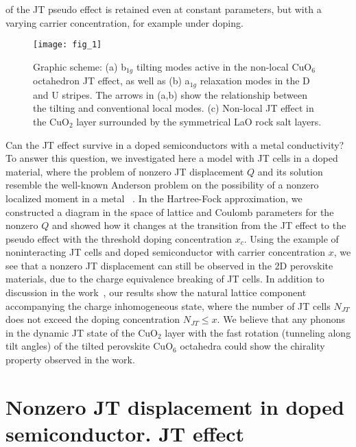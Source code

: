 \documentclass[%
 reprint,
groupedaddress,
 amsmath,amssymb,
 aps,
prb,
]{revtex4-1}
\begin{document}
of the JT pseudo effect is retained even at constant parameters, but with a varying carrier concentration, for example under doping.\\

\begin{figure*}
\texttt{[image: fig\_1]}
\caption{Graphic scheme: (a) b$_{1g}$ tilting modes active in the non-local CuO$_6$ octahedron JT effect, as well as (b) a$_{1g}$ relaxation modes in the D and U stripes. The arrows in (a,b) show the relationship between the tilting and conventional local modes. (c) Non-local JT effect in the CuO$_2$ layer surrounded by the symmetrical LaO rock salt layers.}
\label{fig:1}
\end{figure*}

Can the JT effect survive in a doped semiconductors with a metal conductivity? To answer this question, we investigated here a model with JT cells in a doped material, where the problem of nonzero JT displacement $Q$ and its solution resemble the well-known Anderson problem on the possibility of a nonzero localized moment in a metal ~\cite{Anderson1961}. In the Hartree-Fock approximation, we constructed a diagram in the space of lattice and Coulomb parameters for the nonzero $Q$ and showed how it changes at the transition from the JT effect to the pseudo effect with the threshold   doping concentration $x_c$. Using the example of noninteracting JT cells and doped semiconductor with carrier concentration $x$, we see that a nonzero JT displacement can still be observed in the 2D perovskite  materials, due to the charge equivalence breaking of JT cells. In addition to discussion in the work~\cite{Robinson2019}, our results show the natural lattice component accompanying the charge inhomogeneous state, where the number of JT cells $N_{JT}$  does not exceed the doping concentration $N_{JT}\leq x$.  We believe that any phonons in the dynamic JT state of the CuO$_2$ layer with the fast rotation (tunneling along tilt angles) of the tilted perovskite CuO$_6$ octahedra could show the chirality property observed in the work.~\cite{Grissonnanche2020}


\section{\label{sec:II} Nonzero JT displacement in doped semiconductor. JT effect  \\}
\end{document}
